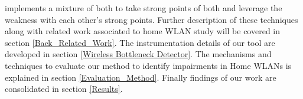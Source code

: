implements a mixture of both to take strong points of both and leverage the weakness with each other's strong points. Further description of these techniques along with related work associated to home WLAN study will be covered in section \ref{Back_Related_Work}. The instrumentation details of our tool are developed in section \ref{Wireless Bottleneck Detector}. The mechanisms and techniques to evaluate our method to identify impairments in Home WLANs is explained in section \ref{Evaluation_Method}. Finally findings of our work are consolidated in section \ref{Results}.